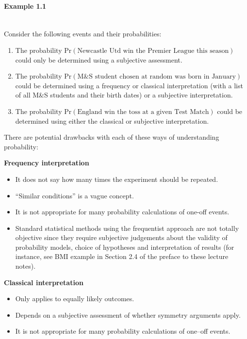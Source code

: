 \paragraph{Example 1.1}{~\\
Consider the following events and their probabilities:
\begin{enumerate}
\item The probability $\text{Pr}(\text{Newcastle Utd win the Premier League
this season})$ could only be determined using a subjective assessment.
\item The probability $\text{Pr}(\text{M\&S student chosen at random was born in
January})$ could be determined using a frequency or classical
interpretation (with a list of all M\&S students and their birth dates)
or a subjective interpretation.
\item The probability $\text{Pr}(\text{England win the toss at a given Test
Match})$ could be determined using either the classical or subjective
interpretation.
\end{enumerate}}

There are potential drawbacks with each of these ways of understanding
probability:

\textbf{Frequency interpretation}
\begin{itemize}
\item It does not say how many times the experiment should be repeated.
\item ``Similar conditions'' is a vague concept.
\item It is not appropriate for many probability calculations of one-off
events.
\item Standard statistical methods using the frequentist approach are
not totally objective since they require subjective judgements about
the validity of probability models, choice of hypotheses and
interpretation of results (for instance, see BMI example in Section 2.4 of the preface to these lecture notes). 
\end{itemize}

\textbf{Classical interpretation}
\begin{itemize}
\item Only applies to equally likely outcomes.
\item Depends on a subjective assessment of whether symmetry arguments
apply. 
\item It is not appropriate for many probability calculations of one--off
events.
\end{itemize}

